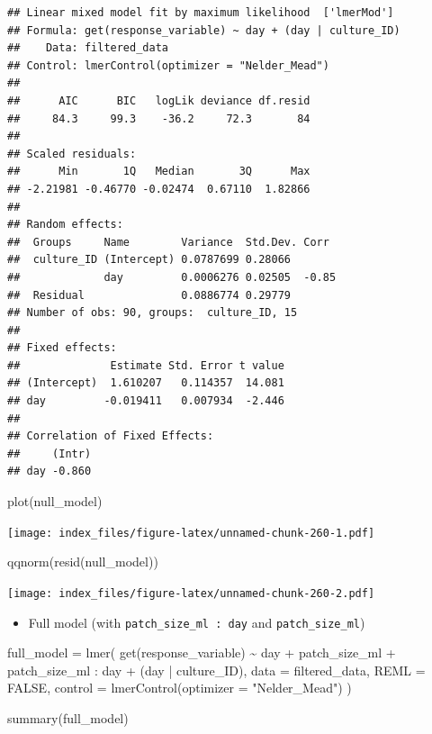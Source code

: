 \documentclass[
]{article}
\newenvironment{Shaded}{\begin{snugshade}}{\end{snugshade}}
\newcommand{\AttributeTok}[1]{\textcolor[rgb]{0.77,0.63,0.00}{#1}}
\newcommand{\ConstantTok}[1]{\textcolor[rgb]{0.00,0.00,0.00}{#1}}
\newcommand{\FunctionTok}[1]{\textcolor[rgb]{0.00,0.00,0.00}{#1}}
\newcommand{\NormalTok}[1]{#1}
\newcommand{\OtherTok}[1]{\textcolor[rgb]{0.56,0.35,0.01}{#1}}
\newcommand{\SpecialCharTok}[1]{\textcolor[rgb]{0.00,0.00,0.00}{#1}}
\newcommand{\StringTok}[1]{\textcolor[rgb]{0.31,0.60,0.02}{#1}}
\providecommand{\tightlist}{%
  \setlength{\itemsep}{0pt}\setlength{\parskip}{0pt}}
\begin{document}
\begin{verbatim}
## Linear mixed model fit by maximum likelihood  ['lmerMod']
## Formula: get(response_variable) ~ day + (day | culture_ID)
##    Data: filtered_data
## Control: lmerControl(optimizer = "Nelder_Mead")
## 
##      AIC      BIC   logLik deviance df.resid 
##     84.3     99.3    -36.2     72.3       84 
## 
## Scaled residuals: 
##      Min       1Q   Median       3Q      Max 
## -2.21981 -0.46770 -0.02474  0.67110  1.82866 
## 
## Random effects:
##  Groups     Name        Variance  Std.Dev. Corr 
##  culture_ID (Intercept) 0.0787699 0.28066       
##             day         0.0006276 0.02505  -0.85
##  Residual               0.0886774 0.29779       
## Number of obs: 90, groups:  culture_ID, 15
## 
## Fixed effects:
##              Estimate Std. Error t value
## (Intercept)  1.610207   0.114357  14.081
## day         -0.019411   0.007934  -2.446
## 
## Correlation of Fixed Effects:
##     (Intr)
## day -0.860
\end{verbatim}

\begin{Shaded}
\begin{Highlighting}[]
\FunctionTok{plot}\NormalTok{(null\_model)}
\end{Highlighting}
\end{Shaded}

\texttt{[image: index\_files/figure-latex/unnamed-chunk-260-1.pdf]}

\begin{Shaded}
\begin{Highlighting}[]
\FunctionTok{qqnorm}\NormalTok{(}\FunctionTok{resid}\NormalTok{(null\_model))}
\end{Highlighting}
\end{Shaded}

\texttt{[image: index\_files/figure-latex/unnamed-chunk-260-2.pdf]}

\begin{itemize}
\tightlist
\item
  Full model (with \texttt{patch\_size\_ml\ :\ day} and
  \texttt{patch\_size\_ml})
\end{itemize}

\begin{Shaded}
\begin{Highlighting}[]
\NormalTok{full\_model }\OtherTok{=} \FunctionTok{lmer}\NormalTok{(}
  \FunctionTok{get}\NormalTok{(response\_variable) }\SpecialCharTok{\textasciitilde{}}
\NormalTok{    day }\SpecialCharTok{+}
\NormalTok{    patch\_size\_ml }\SpecialCharTok{+}
\NormalTok{    patch\_size\_ml }\SpecialCharTok{:}\NormalTok{ day }\SpecialCharTok{+}
\NormalTok{    (day }\SpecialCharTok{|}\NormalTok{ culture\_ID),}
  \AttributeTok{data =}\NormalTok{ filtered\_data,}
  \AttributeTok{REML =} \ConstantTok{FALSE}\NormalTok{,}
  \AttributeTok{control =} \FunctionTok{lmerControl}\NormalTok{(}\AttributeTok{optimizer =} \StringTok{"Nelder\_Mead"}\NormalTok{)}
\NormalTok{)}

\FunctionTok{summary}\NormalTok{(full\_model)}
\end{Highlighting}
\end{Shaded}
\end{document}
